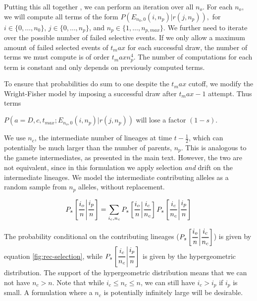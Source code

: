 \documentclass[review]{elsarticle}
\newcommand{\Dfrac}[2]{%
  \ooalign{%
    $\genfrac{}{}{1.2pt}0{#1}{#2}$\cr%
    $\color{white}\genfrac{}{}{.4pt}0{\phantom{#1}}{\phantom{#2}}$}%
}
\newcommand{\cond}{\middle\vert}
\newcommand{\sgcomment}[1]{{\color{red}{SG: #1}}}
\begin{document}
Putting this all together \sgcomment{pseudocode?}, we can perform an iteration over all $n_o.$ For
each $n_o,$ we will compute all terms of the form $P(E_{n_0,0}(i,n_p) | r(j, n_p)),$ for
$i\in\{0,\ldots,n_0\}$, $j\in \{0,\ldots,n_p\}$, and $n_p \in\{1,\ldots,n_{p,max}\}.$ We further
need to iterate over the possible number of failed selective events. If we only allow a maximum
amount of failed selected events of $t_max$ for each successful draw, the number of terms we must
compute is of order $t_max n_p^4$. The number of computations for each term is constant and only
depends on previously computed terms.

To ensure that probabilities do sum to one despite the $t_max$ cutoff, we modify the Wright-Fisher model by imposing a successful draw after $t_max-1$ attempt. Thus terms

$P(a=D,c,t_{max}; E_{n_o,0}(i,n_p)  | r(j, n_p))$ will lose a factor $(1-s)$.   























We use $n_c$, the intermediate number of lineages at time $t-\frac{1}{2}$, which can
potentially be much larger than the number of parents, $n_p$. This is analogous to the gamete
intermediates, as presented in the main text. However, the two are not equivalent, since in this
formulation we apply selection \emph{and} drift on the intermediate lineages. We model the
intermediate contributing alleles as a random sample from $n_p$ alleles, without replacement.

\begin{equation}
  P_s\left[ \Dfrac{i_o}{n} \cond \Dfrac{i_p}{n} \right] = \sum_{i_c,n_c}P_s\left[ \Dfrac{i_o}{n}
    \cond \Dfrac{i_c}{n_c} \right] P_s\left[ \Dfrac{i_c}{n_c} \cond \Dfrac{i_p}{n} \right]
\end{equation}

The probability conditional on the contributing lineages
($P_s\left[ \Dfrac{i_o}{n} \cond \Dfrac{i_c}{n_c} \right]$) is given by equation
\ref{fig:rec-selection}, while $P_s\left[ \Dfrac{i_c}{n_c} \cond \Dfrac{i_p}{n} \right]$ is given by
the hypergeometric distribution. The support of the hypergeometric distribution means that we can
not have $n_c>n$. Note that while $i_c \le n_c \le n$, we can still have $i_c>i_p$ if $i_p$ is
small. A formulation where a $n_c$ is potentially infinitely large will be desirable.
\end{document}
